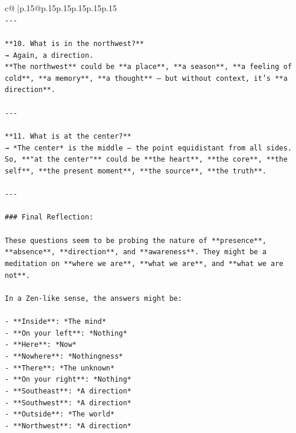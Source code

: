 \documentclass{article}
\begin{document}
{\begin{supertabular}{c@{$\;$}|p{.15\linewidth}@{}p{.15\linewidth}p{.15\linewidth}p{.15\linewidth}p{.15\linewidth}p{.15\linewidth}}
{{{\\ 
\texttt{{-}{-}{-}} \\
\\ 
\texttt{**10. What is in the northwest?**  } \\
\texttt{→ Again, a direction.  } \\
\texttt{**The northwest** could be **a place**, **a season**, **a feeling of cold**, **a memory**, **a thought** — but without context, it's **a direction**.} \\
\\ 
\texttt{{-}{-}{-}} \\
\\ 
\texttt{**11. What is at the center?**  } \\
\texttt{→ *The center* is the middle — the point equidistant from all sides.  } \\
\texttt{So, **"at the center"** could be **the heart**, **the core**, **the self**, **the present moment**, **the source**, **the truth**.} \\
\\ 
\texttt{{-}{-}{-}} \\
\\ 
\texttt{\#\#\# Final Reflection:} \\
\\ 
\texttt{These questions seem to be probing the nature of **presence**, **absence**, **direction**, and **awareness**. They might be a meditation on **where we are**, **what we are**, and **what we are not**.} \\
\\ 
\texttt{In a Zen{-}like sense, the answers might be:} \\
\\ 
\texttt{{-} **Inside**: *The mind*  } \\
\texttt{{-} **On your left**: *Nothing*  } \\
\texttt{{-} **Here**: *Now*  } \\
\texttt{{-} **Nowhere**: *Nothingness*  } \\
\texttt{{-} **There**: *The unknown*  } \\
\texttt{{-} **On your right**: *Nothing*  } \\
\texttt{{-} **Southeast**: *A direction*  } \\
\texttt{{-} **Southwest**: *A direction*  } \\
\texttt{{-} **Outside**: *The world*  } \\
\texttt{{-} **Northwest**: *A direction*  } \\
}}}
\end{supertabular}}
\end{document}
